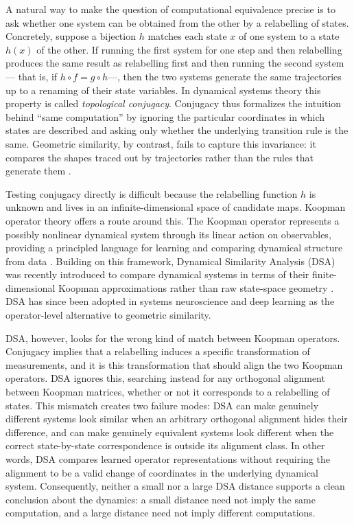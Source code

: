\documentclass{article}
\theoremstyle{definition}
\begin{document}
A natural way to make the question of computational equivalence precise is to ask whether one system can be obtained from the other by a relabelling of states. Concretely, suppose a bijection $h$ matches each state $x$ of one system to a state $h(x)$ of the other. 
If running the first system for one step and then relabelling produces the same result as relabelling first and then running the second system --- that is, if $h \circ f = g \circ h$---, then the two systems generate the same trajectories up to a renaming of their state variables. In dynamical systems theory this property is called \emph{topological conjugacy}. %
Conjugacy thus formalizes the intuition behind ``same computation'' by ignoring the particular coordinates in which states are described and asking only whether the underlying transition rule is the same. Geometric similarity, by contrast, fails to capture this invariance: it compares the shapes traced out by trajectories rather than the rules that generate them \citep{kriegeskorte2008representational, raghu2017svcca, williams2021generalized}.

Testing conjugacy directly is difficult because the relabelling function $h$ is unknown and lives in an infinite-dimensional space of candidate maps. Koopman operator theory offers a route around this. The Koopman operator represents a possibly nonlinear dynamical system through its linear action on observables, providing a principled language for learning and comparing dynamical structure from data \citep{koopman1931hamiltonian}. Building on this framework, Dynamical Similarity Analysis (DSA) was recently introduced to compare dynamical systems in terms of their finite-dimensional Koopman approximations rather than raw state-space geometry \citep{ostrow2023beyond}. DSA has since been adopted in systems neuroscience and deep learning as the operator-level alternative to geometric similarity.



DSA, however, looks for the wrong kind of match between Koopman operators. Conjugacy implies that a relabelling induces a specific transformation of measurements, and it is this transformation that should align the two Koopman operators. DSA ignores this, searching instead for any orthogonal alignment between Koopman matrices, whether or not it corresponds to a relabelling of states. This mismatch creates two failure modes: DSA can make genuinely different systems look similar when an arbitrary orthogonal alignment hides their difference, and can make genuinely equivalent systems look different when the correct state-by-state correspondence is outside its alignment class. In other words, DSA compares learned operator representations without requiring the alignment to be a valid change of coordinates in the underlying dynamical system. Consequently, neither a small nor a large DSA distance supports a clean conclusion about the dynamics: a small distance need not imply the same computation, and a large distance need not imply different computations.
\end{document}

